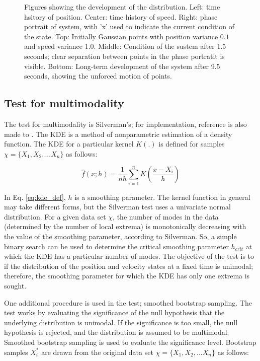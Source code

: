 \documentclass[]{article}
\begin{document}
\begin{figure}[tb!]
\caption{Figures showing the development of the distribution. Left: time hsitory of position. Center: time history of speed. Right: phase portrait of system, with 'x' used to indicate the current condition of the state. Top: Initially Gaussian points with position variance $0.1$ and speed variance $1.0$. Middle: Condition of the sustem after 1.5 seconds; clear separation between points in the phase portratit is visible. Bottom: Long-term development of the system after 9.5 seconds, showing the unforced motion of points.}
\label{fig:bifurcation_animate_1}
\end{figure}


\subsection{Test for multimodality}

The test for multimodality is Silverman's\cite{silverman}; for implementation, reference is also made to \cite{adereth}. The KDE is a method of nonparametric estimation of a density function. The KDE for a particular kernel $K(.)$ is defined for samples $\chi = \{ X_1,X_2,...X_n \}$ as follows:

\begin{equation}
\hat{f}(x;h) = \frac{1}{nh} \sum_{i=1}^{n} K(\frac{x-X_i}{h})
\label{eq:kde_def}
\end{equation}

In Eq. \ref{eq:kde_def}, $h$ is a smoothing parameter. The kernel function in general may take different forms, but the Silverman test uses a univariate normal distribution. For a given data set $\chi$, the number of modes in the data (determined by the number of local extrema) is monotonically decreasing with the value of the smoothing parameter, according to Silverman\cite{silverman}. So, a simple binary search can be used to determine the critical smoothing parameter $h_{crit}$ at which the KDE has a particular number of modes. The objective of the test is to if the distribution of the position and velocity states at a fixed time is unimodal; therefore, the smoothing parameter for which the KDE has only one extrema is sought.

One additional procedure is used in the test; smoothed bootstrap sampling. The test works by evaluating the significance of the null hypothesis that the underlying distribution is unimodal. If the significance is too small, the null hypothesis is rejected, and the distribution is assumed to be multimodal. Smoothed bootstrap sampling is used to evaluate the significance level. Bootstrap samples $X_i^*$ are drawn from the original data set $\chi = \{ X_1,X_2,...X_n \}$ as follows:
\end{document}
